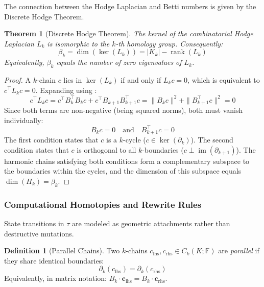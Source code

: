 \documentclass[manuscript, nonacm, review=false]{acmart}
\theoremstyle{definition}
\newtheorem{definition}{Definition}[section]
\theoremstyle{plain}
\newtheorem{theorem}{Theorem}[section]
\newcommand{\F}{\mathbb{F}}
\newcommand{\rank}{\operatorname{rank}}
\newcommand{\img}{\operatorname{im}}
\newcommand{\toposLang}{\ensuremath{\tau}\text{-Lang}}
\begin{document}
The connection between the Hodge Laplacian and Betti numbers is given by the Discrete Hodge Theorem.

\begin{theorem}[Discrete Hodge Theorem]
\label{thm:hodge}
The kernel of the combinatorial Hodge Laplacian $L_k$ is isomorphic to the $k$-th homology group. Consequently:
\begin{equation}
    \beta_k = \dim(\ker(L_k)) = |K_k| - \rank(L_k)
    \label{eq:hodge_betti}
\end{equation}
Equivalently, $\beta_k$ equals the number of zero eigenvalues of $L_k$.
\end{theorem}

\begin{proof}
A $k$-chain $c$ lies in $\ker(L_k)$ if and only if $L_k c = 0$, which is equivalent to $c^\top L_k c = 0$. Expanding using :
\begin{equation}
    c^\top L_k c = c^\top B_k^\top B_k c + c^\top B_{k+1} B_{k+1}^\top c = \|B_k c\|^2 + \|B_{k+1}^\top c\|^2 = 0
\end{equation}
Since both terms are non-negative (being squared norms), both must vanish individually:
\begin{equation}
    B_k c = 0 \quad \text{and} \quad B_{k+1}^\top c = 0
\end{equation}
The first condition states that $c$ is a $k$-cycle ($c \in \ker(\partial_k)$). The second condition states that $c$ is orthogonal to all $k$-boundaries ($c \perp \img(\partial_{k+1})$). The harmonic chains satisfying both conditions form a complementary subspace to the boundaries within the cycles, and the dimension of this subspace equals $\dim(H_k) = \beta_k$.
\end{proof}


\subsubsection{Computational Homotopies and Rewrite Rules}

State transitions in \toposLang{} are modeled as geometric attachments rather than destructive mutations.

\begin{definition}[Parallel Chains]
\label{def:parallel}
Two $k$-chains $c_{\text{lhs}}, c_{\text{rhs}} \in C_k(K; \F)$ are \emph{parallel} if they share identical boundaries:
\begin{equation}
    \partial_k(c_{\text{lhs}}) = \partial_k(c_{\text{rhs}})
\end{equation}
Equivalently, in matrix notation: $B_k \cdot \mathbf{c}_{\text{lhs}} = B_k \cdot \mathbf{c}_{\text{rhs}}$.
\end{definition}
\end{document}
